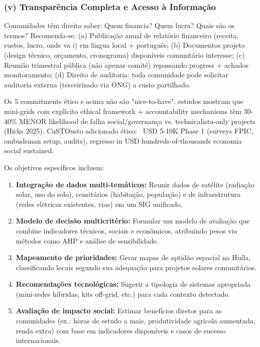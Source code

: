 \documentclass[12pt, a4paper]{article}
\begin{document}
{{{{{{{{{{{{\subsubsection{(v) Transparência Completa e Acesso à Informação}
Comunidades têm direito saber: Quem financia? Quem lucra? Quais são os termos? Recomenda-se: (a) Publicação anual de relatório financeiro (receita, custos, lucro, onde va i) em língua local + português; (b) Documentos projeto (design técnico, orçamento, cronograma) disponíveis comunitário interesse; (c) Reunião trimestral pública (não apenas comité) repassando progress + achados monitoramento; (d) Direito de auditoria: toda comunidade pode solicitar auditoria externa (terceirizado via ONG) a custo partilhado.

Os 5 commitments ético s acima não são "nice-to-have": estudos mostram que mini-grids com explícito ethical framework + accountability mechanisms têm 30-40\% MENOR likelihood de falha social/governança vs. technicalista-only projects (Hicks 2025). CuSTOusto adicionado ético: ~USD 5-10K Phase 1 (surveys FPIC, ombudsman setup, audits), regresso in USD hundreds-of-thousands economia social sustained.

Os objetivos específicos incluem:

\begin{enumerate}
\item \textbf{Integração de dados multi-temáticos:} Reunir dados de satélite (radiação solar, uso do solo), censitários (habitação, população) e de infraestrutura (redes elétricas existentes, vias) em um SIG unificado.
\item \textbf{Modelo de decisão multicritério:} Formular um modelo de avaliação que combine indicadores técnicos, sociais e econômicos, atribuindo pesos via métodos como AHP e análise de sensibilidade.
\item \textbf{Mapeamento de prioridades:} Gerar mapas de aptidão espacial na Huíla, classificando locais segundo sua adequação para projetos solares comunitários.
\item \textbf{Recomendações tecnológicas:} Sugerir a tipologia de sistemas apropriada (mini-redes híbridas, kits off-grid, etc.) para cada contexto detectado.
\item \textbf{Avaliação de impacto social:} Estimar benefícios diretos para as comunidades (ex.: horas de estudo a mais, produtividade agrícola aumentada, renda extra) com base em indicadores disponíveis e casos de sucesso internacionais.
\end{enumerate}

}}}}}}}}}}}}
\end{document}
